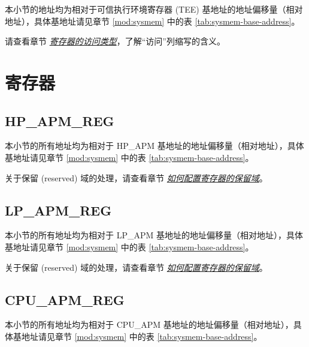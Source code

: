 \documentclass[main\_\_CN.tex]{subfiles}
\begin{document}
本小节的地址均为相对于可信执行环境寄存器 (TEE) 基地址的地址偏移量（相对地址），具体基地址请见章节 \ref{mod:sysmem} \textit{} 中的表 \ref{tab:sysmem-base-address}。

请查看章节 \hyperref[glossary-access-types]{\textit{寄存器的访问类型}}，了解“访问”列缩写的含义。





\newpage
\section{寄存器}

\subsection{HP\_APM\_REG}

本小节的所有地址均为相对于 HP\_APM 基地址的地址偏移量（相对地址），具体基地址请见章节 \ref{mod:sysmem} \textit{} 中的表 \ref{tab:sysmem-base-address}。

关于保留 (reserved) 域的处理，请查看章节 \hyperref[programming-reserved-field]{\textit{如何配置寄存器的保留域}}。



\subsection{LP\_APM\_REG}

本小节的所有地址均为相对于 LP\_APM 基地址的地址偏移量（相对地址），具体基地址请见章节 \ref{mod:sysmem} \textit{} 中的表 \ref{tab:sysmem-base-address}。

关于保留 (reserved) 域的处理，请查看章节 \hyperref[programming-reserved-field]{\textit{如何配置寄存器的保留域}}。



\subsection{CPU\_APM\_REG}

本小节的所有地址均为相对于 CPU\_APM 基地址的地址偏移量（相对地址），具体基地址请见章节 \ref{mod:sysmem} \textit{} 中的表 \ref{tab:sysmem-base-address}。
\end{document}
